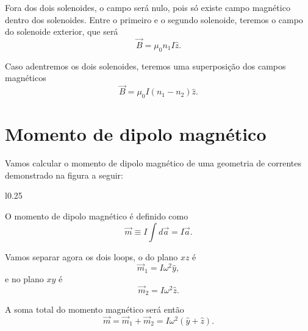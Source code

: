 \documentclass{article}
\begin{document}
Fora dos dois solenoides, o campo será nulo, pois só existe campo magnético dentro dos solenoides. Entre o primeiro e o segundo solenoide, teremos o campo do solenoide
exterior, que será
\begin{equation}
 \vec{B} = \mu_0 n_1 I \hat{z}.
\end{equation}

Caso adentremos os dois solenoides, teremos uma superposição dos campos magnéticos
\begin{equation}
 \vec{B} = \mu_0 I (n_1 - n_2) \hat{z}.
\end{equation}

\section{Momento de dipolo magnético}
Vamos calcular o momento de dipolo magnético de uma geometria de correntes demonstrado na figura a seguir:

\begin{wrapfigure}[9]{l}{0.25\textwidth}
\end{wrapfigure}
O momento de dipolo magnético é definido como
\begin{equation}
 \vec{m} \equiv I \int d\vec{a} = I \vec{a}.
\end{equation}

Vamos separar agora os dois loops, o do plano $xz$ é
\begin{equation}
 \vec{m}_1 = I\omega^2 \hat{y},
\end{equation}
e no plano $xy$ é
\begin{equation}
 \vec{m}_2 = I\omega^2 \hat{z}.
\end{equation}

A soma total do momento magnético será então
\begin{equation}
 \vec{m} = \vec{m}_1 + \vec{m}_2 = I\omega^2 (\hat{y} + \hat{z}).
\end{equation}
\end{document}
